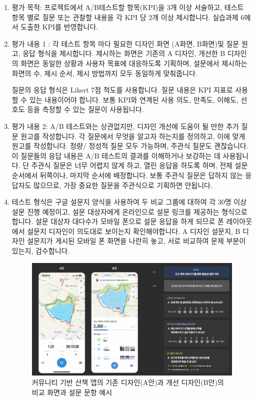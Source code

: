 \documentclass[
  letterpaper,
]{book}
\begin{document}
\begin{enumerate}
\def\labelenumi{\arabic{enumi}.}
\item
  평가 목적: 프로젝트에서 A/B테스트할 항목(KPI)을 3개 이상 서술하고,
  테스트 항목 별로 질문 또는 관찰할 내용을 각 KPI 당 2개 이상
  제시합니다. 실습과제 6에서 도출한 KPI를 반영합니다.
\item
  평가 내용 1 : 각 테스트 항목 마다 필요한 디자인 화면 (A화면, B화면)및
  질문 원고, 응답 형식을 제시합니다. 제시하는 화면은 기존의 A 디자인,
  개선한 B 디자인의 화면은 동일한 상황과 사용자 목표에 대응하도록
  기획하며, 설문에서 제시하는 화면의 수, 제시 순서, 제시 방법까지 모두
  동일하게 맞춰줍니다.

  질문의 응답 형식은 Likert 7점 척도를 사용합니다. 질문 내용은 KPI
  지표로 사용할 수 있는 내용이어야 합니다. 보통 KPI와 연계된 사용 의도,
  만족도, 이해도, 선호도 등을 측정할 수 있는 질문이 사용됩니다.
\item
  평가 내용 2: A/B 테스트와는 상관없지만, 디자인 개선에 도움이 될 만한
  추가 질문 원고를 작성합니다. 각 질문에서 무엇을 알고자 하는지를
  정의하고, 이에 맞게 원고를 작성합니다. 정량/ 정성적 질문 모두
  가능하며, 주관식 질문도 괜찮습니다. 이 질문들의 응답 내용은 A/B
  테스트의 결과를 이해하거나 보강하는 데 사용됩니다. 단 주관식 질문은
  너무 어렵지 않게 하고, 열린 응답을 하도록 하며, 전체 설문 순서에서
  뒤쪽이나, 마지막 순서에 배정합니다. 보통 주관식 질문은 답하지 않는
  응답자도 많으므로, 가장 중요한 질문을 주관식으로 기획하면 안됩니다.
\item
  테스트 형식은 구글 설문지 양식을 사용하여 두 비교 그룹에 대하여 각
  30명 이상 설문 진행 예정이고, 설문 대상자에게 온라인으로 설문 링크를
  제공하는 형식으로 합니다. 설문 대상자 대다수가 모바일 폰으로 설문
  응답을 하게 되므로 폰 레이아웃에서 설문지 디자인이 의도대로 보이는지
  확인해야합니다. A 디자인 설문지, B 디자인 설문지가 게시된 모바일 폰
  화면을 나란히 놓고, 서로 비교하여 문제 부분이 있는지, 검수합니다.

  \begin{figure}[H]

  {\centering \includegraphics{img/fig30.png}

  }

  \caption{커뮤니티 기반 산책 앱의 기존 디자인(A안)과 개선 디자인(B안)의
  비교 화면과 설문 문항 예시}

  \end{figure}%
\end{enumerate}
\end{document}
